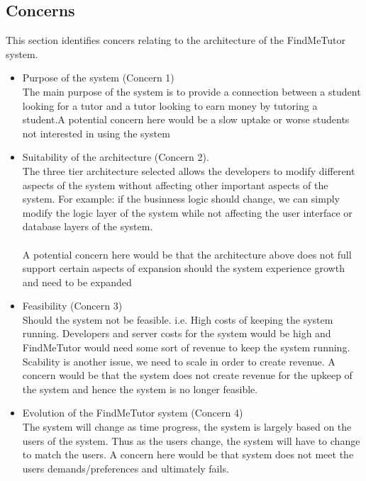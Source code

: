 \documentclass[12pt]{article}
\begin{document}
\subsection{Concerns}
This section identifies concers relating to the architecture of the FindMeTutor system.
\begin{itemize}

\item Purpose of the system (Concern 1)\\
The main purpose of the system is to provide a connection between a student looking for a tutor and a tutor looking to earn money by tutoring a student.A potential concern here would be a slow uptake or worse students not interested in using the system

\item Suitability of the architecture (Concern 2).\\
The three tier architecture selected allows the developers to modify different aspects of the system without affecting other important aspects of the system. For example: if the businness logic should change, we can simply modify the logic layer of the system while not affecting the user interface or database layers of the system.\\\\A potential concern here would be that the architecture above does not full support certain aspects of expansion should the system experience growth and need to be expanded

\item Feasibility (Concern 3)\\
Should the system not be feasible. i.e. High costs of keeping the system running. Developers and server costs for the system would be high and FindMeTutor would need some sort of revenue to keep the system running. Scability is another issue, we need to scale in order to create revenue. A concern would be that the system does not create revenue for the upkeep of the system and hence the system is no longer feasible.

\item Evolution of the FindMeTutor system (Concern 4)\\
The system will change as time progress, the system is largely based on the users of the system. Thus as the users change, the system will have to change to match the users. A concern here would be that system does not meet the users demands/preferences and ultimately fails.
\end{itemize}
\end{document}

